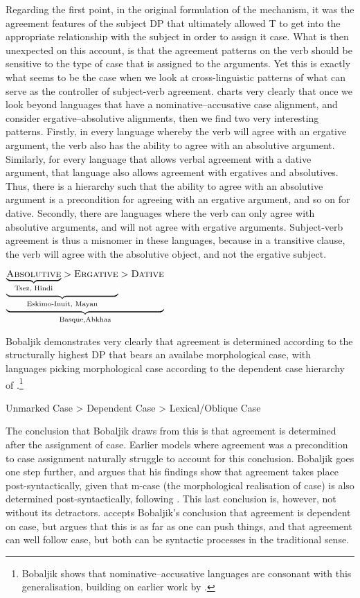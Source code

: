 \documentclass[output=paper
,modfonts
,nonflat]{langsci/langscibook}
\begin{document}
Regarding the first point, in the original formulation of the {\agr} mechanism, it was the agreement features of the subject DP that ultimately allowed T to get into the appropriate relationship with the subject in order to assign it case.
What is then unexpected on this account, is that the agreement patterns on the verb should be sensitive to the type of case that is assigned to the arguments.
Yet this is exactly what seems to be the case when we look at cross-linguistic patterns of what can serve as the controller of subject-verb agreement.
\citet{Bobaljik2008} charts very clearly that once we look beyond languages that have a nominative--accusative case alignment, and consider ergative--absolutive alignments, then we find two very interesting patterns.
Firstly, in every language whereby the verb will agree with an ergative argument, the verb also has the ability to agree with an absolutive argument.
Similarly, for every language that allows verbal agreement with a dative argument, that language also allows agreement with ergatives and absolutives.
Thus, there is a hierarchy such that the ability to agree with an absolutive argument is a precondition for agreeing with an ergative argument, and so on for dative.
Secondly, there are languages where the verb can only agree with absolutive arguments, and will not agree with ergative arguments.
Subject-verb agreement is thus a misnomer in these languages, because in a transitive clause, the verb will agree with the absolutive object, and not the ergative subject.

\begin{exe}
	\ex
	$\underbrace{\underbrace{\underbrace{\textsc{Absolutive}}_{\text{Tsez, Hindi}} > \textsc{Ergative}}_{\text{Eskimo-Inuit, Mayan}} > \textsc{Dative}}_{\text{Basque,Abkhaz}}$
\end{exe}
Bobaljik demonstrates very clearly that agreement is determined according to the structurally highest DP that bears an availabe morphological case, with languages picking morphological case according to the dependent case hierarchy of \citet{Marantz1991}.\footnote{Bobaljik shows that nominative--accusative languages are consonant with this generalisation, building on earlier work by \citet{Moravcsik1974}.}

\begin{exe}
	\ex
	Unmarked Case \textgreater {} Dependent Case \textgreater {} Lexical/Oblique Case
\end{exe}
The conclusion that Bobaljik draws from this is that agreement is determined after the assignment of case.
Earlier models where agreement was a precondition to case assignment naturally struggle to account for this conclusion.
Bobaljik goes one step further, and argues that his findings show that agreement takes place post-syntactically, given that m-case (the morphological realisation of case) is also determined post-syntactically, following \citet{Marantz1991}.
This last conclusion is, however, not without its detractors.
\citet{preminger2011,preminger2015} accepts Bobaljik's conclusion that agreement is dependent on case, but argues that this is as far as one can push things, and that agreement can well follow case, but both can be syntactic processes in the traditional sense.
\end{document}
